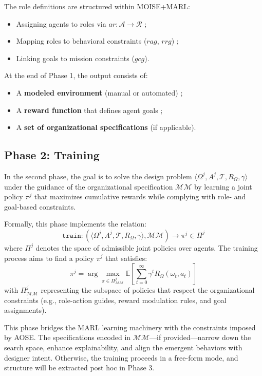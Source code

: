 \documentclass[pdflatex,sn-mathphys-num]{sn-jnl}%
\theoremstyle{thmstyleone}%
\theoremstyle{thmstyletwo}%
\theoremstyle{thmstylethree}%
\begin{document}
The role definitions are structured within MOISE+MARL:
\begin{itemize}
    \item Assigning agents to roles via $ar: \mathcal{A} \to \mathcal{R}$ ;
    \item Mapping roles to behavioral constraints ($rag$, $rrg$) ;
    \item Linking goals to mission constraints ($gcg$).
\end{itemize}

At the end of Phase 1, the output consists of:
\begin{itemize}
    \item A \textbf{modeled environment} (manual or automated) ;
    \item A \textbf{reward function} that defines agent goals ;
    \item A \textbf{set of organizational specifications} (if applicable).
\end{itemize}

\subsection{Phase 2: Training}

In the second phase, the goal is to solve the design problem $\langle \Omega^j, A^j, \mathcal{T}, R_{\Omega}, \gamma \rangle$ under the guidance of the organizational specification $\mathcal{MM}$ by learning a joint policy $\pi^j$ that maximizes cumulative rewards while complying with role- and goal-based constraints.

Formally, this phase implements the relation:
\[
    \texttt{train}: \left( \langle \Omega^j, A^j, \mathcal{T}, R_{\Omega}, \gamma \rangle, \mathcal{MM} \right) \longrightarrow \pi^j \in \Pi^j
\]
where $\Pi^j$ denotes the space of admissible joint policies over agents. The training process aims to find a policy $\pi^j$ that satisfies:
\[
    \pi^j = \arg\max_{\pi \in \Pi^j_{\mathcal{MM}}} \mathbb{E} \left[ \sum_{t=0}^{\infty} \gamma^t R_{\Omega}(\omega_t, a_t) \right]
\]
with $\Pi^j_{\mathcal{MM}}$ representing the subspace of policies that respect the organizational constraints (e.g., role-action guides, reward modulation rules, and goal assignments).

This phase bridges the MARL learning machinery with the constraints imposed by AOSE. The specifications encoded in $\mathcal{MM}$—if provided—narrow down the search space, enhance explainability, and align the emergent behaviors with designer intent. Otherwise, the training proceeds in a free-form mode, and structure will be extracted post hoc in Phase 3.
\end{document}
